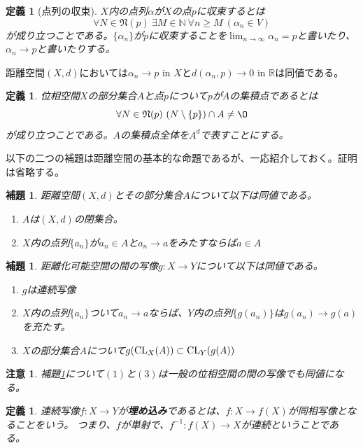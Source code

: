 \documentclass[leqno]{jsarticle}
\newtheorem{lem}[thm]{補題}
\newtheorem{df}[thm]{定義}
\newtheorem*{cau}{注意}
\newcommand{\nn}{\mathbb{N}}
\newcommand{\rr}{\mathbb{R}}
\newcommand{\al}{\alpha}
\newcommand{\cl}{\text{{\rm CL}}}
\begin{document}
\begin{df}[点列の収束]
$X$内の点列$\al$が$X$の点$p$に収束するとは
\[
\forall N\in \mathfrak{N}(p)\ \exists M\in\nn\ \forall n\ge M\ (\al_n\in V)
\]
が成り立つことである。$\{\al_n\}$が$p$に収束することを$\lim_{n\to \infty}\al_n=p$と書いたり、$\al_n\to p$と書いたりする。
\end{df}
距離空間$(X,d)$においては$\al_n\to p$ in $X$と$d(\al_n,p)\to 0$ in $\rr$は同値である。

\begin{df}
位相空間$X$の部分集合$A$と点$p$について$p$が$A$の集積点であるとは
\[
\forall N\in \mathfrak{N}(p)\ (N\setminus \{p\})\cap A\neq \O
\]
が成り立つことである。$A$の集積点全体を$A^d$で表すことにする。
\end{df}

以下の二つの補題は距離空間の基本的な命題であるが、一応紹介しておく。証明は省略する。

\begin{lem}\label{cl}
距離空間$(X,d)$とその部分集合$A$について以下は同値である。
\begin{enumerate}
\item $A$は$(X,d)$の閉集合。
\item $X$内の点列$\{a_n\}$が$a_n\in A$と$a_n\to a$をみたすならば$a\in A$
\end{enumerate}
\end{lem}

\begin{lem}\label{cont}
距離化可能空間の間の写像$g:X\to Y$について以下は同値である。
\begin{enumerate}
\item $g$は連続写像
\item $X$内の点列$\{a_n\}$ついて$a_n\to a$ならば、$Y$内の点列$\{g(a_n)\}$は$g(a_n)\to g(a)$を充たす。
\item $X$の部分集合$A$について$g(\cl_X(A))\subset \cl_Y(g(A))$
\end{enumerate}
\end{lem}

\begin{cau}
補題\ref{cont}について$(1)$と$(3)$は一般の位相空間の間の写像でも同値になる。
\end{cau}

\begin{df}
連続写像$f:X\to Y$が\textbf{埋め込み}であるとは、$f:X\to f(X)$が同相写像となることをいう。
つまり、$f$が単射で、$f^{-1}:f(X)\to X$が連続ということである。
\end{df}
\end{document}

